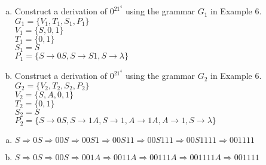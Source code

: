 \documentclass[../main.tex]{subfiles}
\begin{document}
\begin{enumerate}[a)]
	\item Construct a derivation of $0^21^4$ using the grammar $G_1$ in Example 6. \\
		$G_1 = \{V_1, T_1, S_1, P_1\}$ \\
		$V_1 = \{S, 0, 1\}$ \\
		$T_1 = \{0, 1\}$ \\
		$S_1 = S$ \\
		$P_1 = \{S \rightarrow 0S, S \rightarrow S1, S \rightarrow \lambda\}$ \\
	\item Construct a derivation of $0^21^4$ using the grammar $G_2$ in Example 6. \\
		$G_2 = \{V_2, T_2, S_2, P_2\}$ \\
		$V_2 = \{S, A, 0, 1\}$ \\
		$T_2 = \{0, 1\}$ \\
		$S_2 = S$ \\
		$P_2 = \{S \rightarrow 0S, S \rightarrow 1A, S \rightarrow 1, A \rightarrow 1A, A \rightarrow 1, S \rightarrow \lambda\}$ \\
\end{enumerate}

\solution
\begin{enumerate}[a)]
	\item $S \Rightarrow 0S \Rightarrow 00S \Rightarrow 00S1 \Rightarrow 00S11 \Rightarrow 00S111 \Rightarrow 00S1111 \Rightarrow 001111$
	\item $S \Rightarrow 0S \Rightarrow 00S \Rightarrow 001A \Rightarrow 0011A \Rightarrow 00111A \Rightarrow 001111A \Rightarrow 001111$
\end{enumerate}
\end{document}
